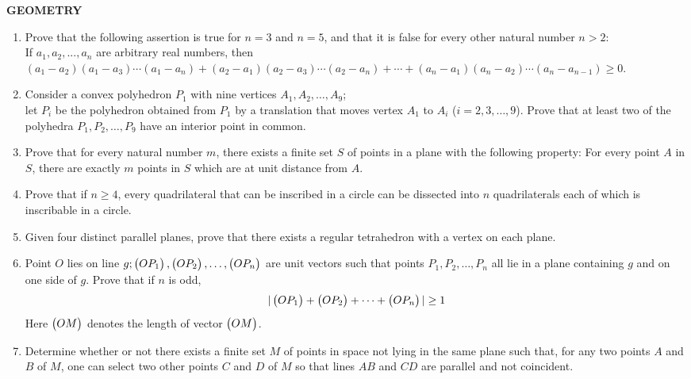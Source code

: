 \documentclass[12pt,-letter paper]{article}
\begin{document}
\begin{center}                                                              \textbf{GEOMETRY}   
\end{center}

\begin{enumerate}

	\item Prove that the following assertion is true for  $n=3$  and  $n=5$,  and that it is false for every other natural number  $n>2 :$\\ 
		If $ a_{1}, a_{2}, ..., a_{n}$ are arbitrary real numbers, then $(a_{1} - a_{2})(a_{1} - a_{3})\cdots(a_{1} - a_{n}) + (a_{2} - a_{1})(a_{2} - a_{3})\cdots(a_{2} - a_{n})+\cdots+(a_{n} - a_{1})(a_{n} - a_{2})\cdots(a_{n} - a_{n-1}) \geq 0$.

\item Consider a convex polyhedron $P_{1}$ with nine vertices $A_{1}, A_{2}, \ldots, A_{9}$; \\
let $P_{i}$ be the polyhedron obtained from $P_{1}$ by a translation that moves vertex $A_{1}$ to $A_{i}$ ($i=2,3,\ldots,9$). Prove that at least two of the polyhedra $P_{1}, P_{2}, \ldots, P_{9}$ have an interior point in common.

\item Prove that for every natural number $m$, there exists a finite set $S$ of points in a plane with the following property: For every point $A$ in $S$, there are exactly $m$ points in $S$ which are at unit distance from $A$.


\item Prove that if $n \geq 4$, every quadrilateral that can be inscribed in a circle can be dissected into $n$ quadrilaterals each of which is inscribable in a circle.

	\item Given four distinct parallel planes, prove that there exists a regular tetrahedron with a vertex on each plane.

\item Point $O$ lies on line $g ; \begin{pmatrix}OP_{1}\end{pmatrix}, \begin{pmatrix}OP_{2}\end{pmatrix}, \ldots, \begin{pmatrix}OP_{n}\end{pmatrix}$ are unit vectors such that points $P_{1}, P_{2}, \ldots, P_{n}$ all lie in a plane containing $g$ and on one side of $g$. Prove that if $n$ is odd, \begin{align}|\begin{pmatrix}OP_{1}\end{pmatrix} + \begin{pmatrix}OP_{2}\end{pmatrix} + \cdots + \begin{pmatrix}OP_{n}\end{pmatrix}| \geq 1\end{align} Here $\begin{pmatrix}OM\end{pmatrix}$ denotes the length of vector $\begin{pmatrix}OM\end{pmatrix}$.
\item Determine whether or not there exists a finite set $M$ of points in space not lying in the same plane such that, for any two points $A$ and $B$ of $M$, one can select two other points $C$ and $D$ of $M$ so that lines $AB$ and $CD$ are parallel and not coincident.


\end{enumerate}
\end{document}
